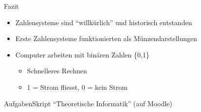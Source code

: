 \begin{frame}{Fazit}
    \begin{itemize}
    \item Zahlensysteme sind ``willkürlich'' und historisch entstanden
    \item Erste Zahlensysteme funktionierten als Münzendarstellungen
        \item Computer arbeiten mit binären Zahlen \{0,1\}
        \begin{itemize}
            \item Schnelleres Rechnen
            \item {} 1 = Strom fliesst, 0 = kein Strom
        \end{itemize}
    \end{itemize}
\end{frame}

\begin{frame}{Aufgaben}{Skript ``Theoretische Informatik'' (auf Moodle)}
\end{frame}